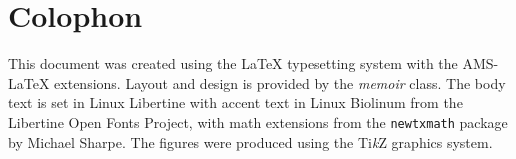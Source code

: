 \documentclass[../book/calcnotes.tex]{subfiles}
\begin{document}
\chapter{Colophon}

This document was created using the \LaTeX{} typesetting system with the AMS-\LaTeX{} extensions.
Layout and design is provided by the \textit{memoir} class.
The body text is set in Linux Libertine with accent text in Linux Biolinum from the Libertine Open Fonts Project, with math extensions from the \texttt{newtxmath} package by Michael Sharpe.
The figures were produced using the Ti\textit{k}Z graphics system.
\end{document}
